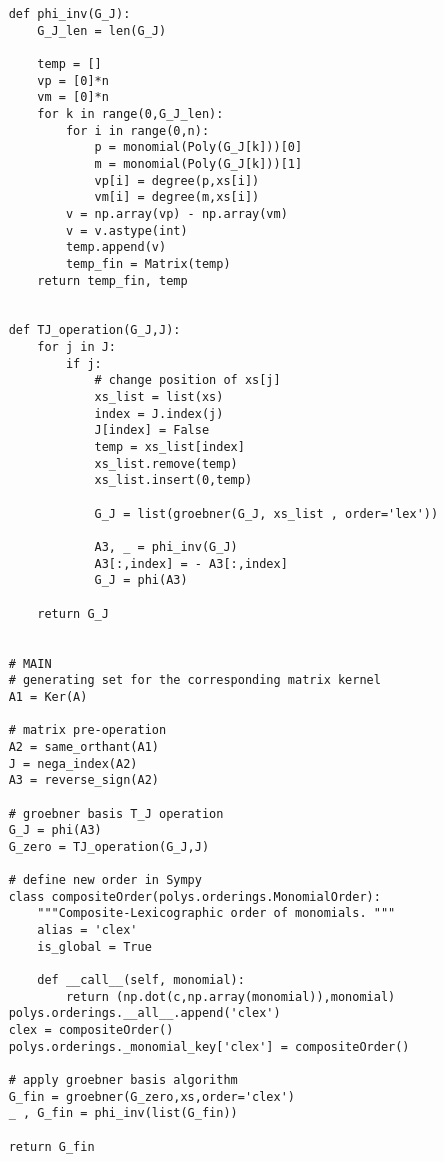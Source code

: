 \documentclass{article}
\theoremstyle{plain}
\theoremstyle{definition}
\begin{document}
\begin{propsition}
\begin{verbatim}
    def phi_inv(G_J):
        G_J_len = len(G_J)

        temp = []
        vp = [0]*n
        vm = [0]*n
        for k in range(0,G_J_len):
            for i in range(0,n):
                p = monomial(Poly(G_J[k]))[0]
                m = monomial(Poly(G_J[k]))[1]
                vp[i] = degree(p,xs[i])
                vm[i] = degree(m,xs[i])
            v = np.array(vp) - np.array(vm)
            v = v.astype(int)
            temp.append(v)
            temp_fin = Matrix(temp)
        return temp_fin, temp
    
    
    def TJ_operation(G_J,J):
        for j in J:
            if j:
                # change position of xs[j]
                xs_list = list(xs)
                index = J.index(j)
                J[index] = False
                temp = xs_list[index]
                xs_list.remove(temp)
                xs_list.insert(0,temp)

                G_J = list(groebner(G_J, xs_list , order='lex'))

                A3, _ = phi_inv(G_J)
                A3[:,index] = - A3[:,index]
                G_J = phi(A3)

        return G_J
    
   
    # MAIN
    # generating set for the corresponding matrix kernel
    A1 = Ker(A)
    
    # matrix pre-operation
    A2 = same_orthant(A1)
    J = nega_index(A2)
    A3 = reverse_sign(A2)
    
    # groebner basis T_J operation
    G_J = phi(A3)
    G_zero = TJ_operation(G_J,J)
    
    # define new order in Sympy
    class compositeOrder(polys.orderings.MonomialOrder):
        """Composite-Lexicographic order of monomials. """
        alias = 'clex'
        is_global = True

        def __call__(self, monomial):
            return (np.dot(c,np.array(monomial)),monomial)
    polys.orderings.__all__.append('clex')
    clex = compositeOrder()
    polys.orderings._monomial_key['clex'] = compositeOrder() 
    
    # apply groebner basis algorithm 
    G_fin = groebner(G_zero,xs,order='clex')
    _ , G_fin = phi_inv(list(G_fin))
    
    return G_fin
\end{verbatim}

\newpage

\newcommand{\doi}[1]{doi: \href{https://doi.org/#1}{#1}}
\begin{thebibliography}{99}  


\end{thebibliography}
\end{propsition}
\end{document}
